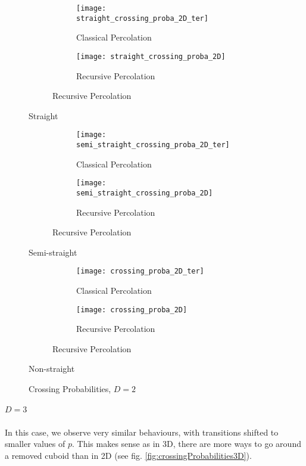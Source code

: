 \begin{figure}[!h]
	\centering
	\begin{subfigure}{\textwidth}
		\begin{subfigure}{.49\textwidth}
			\texttt{[image: straight\_crossing\_proba\_2D\_ter]}
			\centering
			\caption{Classical Percolation}
			\label{fig:crossingProbabilityClassical}
		\end{subfigure}
		\begin{subfigure}{.49\textwidth}
			\texttt{[image: straight\_crossing\_proba\_2D]}
			\centering
			\caption{Recursive Percolation}
			\label{fig:crossingProbabilityRecursive}
		\end{subfigure}
	\end{subfigure}
	Straight
	
	\vspace{0.5cm}
	\begin{subfigure}{\textwidth}
		\begin{subfigure}{.49\textwidth}
			\texttt{[image: semi\_straight\_crossing\_proba\_2D\_ter]}
			\centering
			\caption{Classical Percolation}
		\end{subfigure}
		\begin{subfigure}{.49\textwidth}
			\texttt{[image: semi\_straight\_crossing\_proba\_2D]}
			\centering
			\caption{Recursive Percolation}
		\end{subfigure}
	\end{subfigure}
	Semi-straight
	
	\vspace{0.5cm}
	\begin{subfigure}{\textwidth}
		\begin{subfigure}{.49\textwidth}
			\texttt{[image: crossing\_proba\_2D\_ter]}
			\centering
			\caption{Classical Percolation}
		\end{subfigure}
		\begin{subfigure}{.49\textwidth}
			\texttt{[image: crossing\_proba\_2D]}
			\centering
			\caption{Recursive Percolation}
		\end{subfigure}
	\end{subfigure}
	Non-straight
	
	\vspace{0.25cm}
	\caption{Crossing Probabilities, $D=2$}
	\label{fig:crossingProbabilities2D}
\end{figure}

\subparagraph{$D=3$}
In this case, we observe very similar behaviours, with transitions shifted to smaller values of $p$.
This makes sense as in 3D, there are more ways to go around a removed cuboid than in 2D (see fig. \ref{fig:crossingProbabilities3D}).

